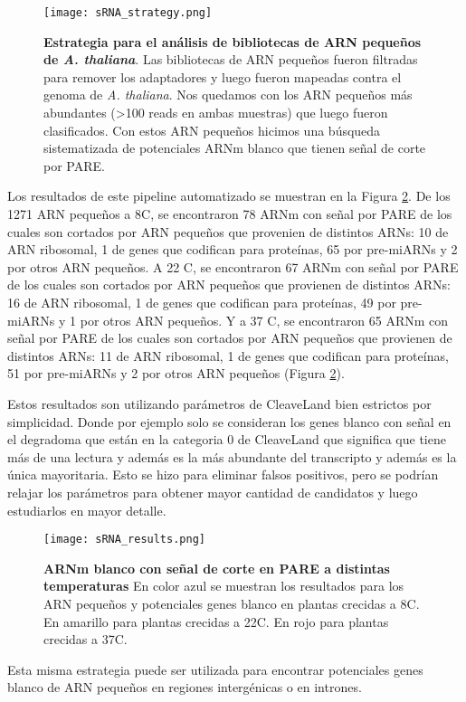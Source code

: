 \begin{figure}[htbp!] 
    \centering    
    \texttt{[image: sRNA\_strategy.png]}
    \caption[Estrategia para el análisis de bibliotecas de ARN pequeños de \textit{A. thaliana}]
    {
    \textbf{Estrategia para el análisis de bibliotecas de ARN pequeños de \textit{A. thaliana}}.
    Las bibliotecas de ARN pequeños fueron filtradas para remover los adaptadores y luego fueron mapeadas contra el genoma de \textit{A. thaliana}.
    Nos quedamos con los ARN pequeños más abundantes (>100 reads en ambas muestras) que luego fueron clasificados.
    Con estos ARN pequeños hicimos una búsqueda sistematizada de potenciales ARNm blanco que tienen señal de corte por PARE.
    }
     \label{fig:sRNA_strategy}
\end{figure}

Los resultados de este pipeline automatizado se muestran en la Figura \ref{fig:sRNA_results}.
De los 1271 ARN pequeños a  8\degree C, se encontraron 78 ARNm con señal por PARE de los cuales son cortados por ARN pequeños que provenien de distintos ARNs: 10 de ARN ribosomal, 1 de genes que codifican para proteínas, 65 por pre-miARNs y 2 por otros ARN pequeños.
A 22 \degree C, se encontraron 67 ARNm con señal por PARE de los cuales son cortados por ARN pequeños que provienen de distintos ARNs: 16 de ARN ribosomal, 1 de genes que codifican para proteínas, 49 por pre-miARNs y 1 por otros ARN pequeños. 
Y a 37 \degree C, se encontraron 65 ARNm con señal por PARE de los cuales son cortados por ARN pequeños que provienen de distintos ARNs: 11 de ARN ribosomal, 1 de genes que codifican para proteínas, 51 por pre-miARNs y 2 por otros ARN pequeños (Figura \ref{fig:sRNA_results}).

Estos resultados son utilizando parámetros de CleaveLand bien estrictos por simplicidad.
Donde por ejemplo solo se consideran los genes blanco con señal en el degradoma que están en la categoria 0 de CleaveLand que significa que tiene más de una lectura y además es la más abundante del transcripto y además es la única mayoritaria.
Esto se hizo para eliminar falsos positivos, pero se podrían relajar los parámetros para obtener mayor cantidad de candidatos y luego estudiarlos en mayor detalle.

\begin{figure}[htbp!] 
    \centering    
    \texttt{[image: sRNA\_results.png]}
    \caption[ARNm blanco con señal de corte en PARE a distintas temperaturas]{
    \textbf{ARNm blanco con señal de corte en PARE a distintas temperaturas}
    En color azul se muestran los resultados para los ARN pequeños y potenciales genes blanco en plantas crecidas a 8\degree C.
    En amarillo para plantas crecidas a  22\degree C.
    En rojo para plantas crecidas a  37\degree C.
   }
     \label{fig:sRNA_results}
\end{figure}

Esta misma estrategia puede ser utilizada para encontrar potenciales genes blanco de ARN pequeños en regiones intergénicas o en intrones.
